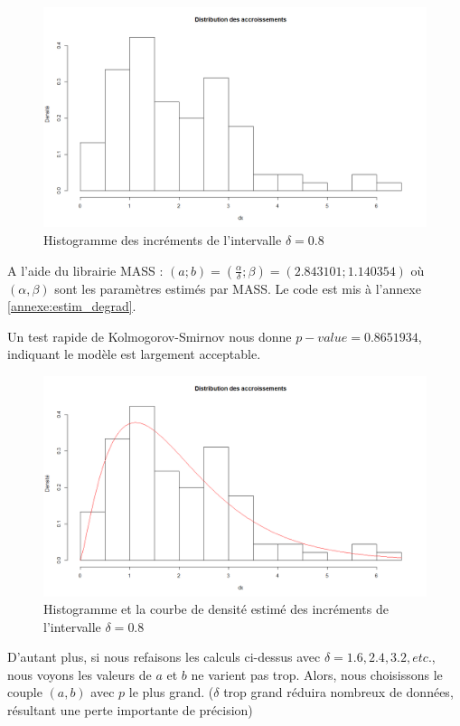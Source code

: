\documentclass[10pt,a4paper]{article}
\begin{document}
\begin{figure}[!h]
    \centering
    \includegraphics[width=\textwidth]{img/histo_degrad.png}
    \caption{Histogramme des incréments de l'intervalle $\delta = 0.8$}
    \label{fig:histo_degrad}
\end{figure}

A l'aide du librairie MASS : $\left( {a;b} \right) = \left( {\frac{\alpha }{\delta };\beta } \right) = \left( {2.843101;1.140354} \right)$ où $(\alpha, \beta)$ sont les paramètres estimés par MASS. Le code est mis à l'annexe \eqref{annexe:estim_degrad}.

Un test rapide de Kolmogorov-Smirnov nous donne $p-value = 0.8651934$, indiquant le modèle est largement acceptable.
\begin{figure}[!h]
    \centering
    \includegraphics[width=\textwidth]{img/histo_dens_degrad.png}
    \caption{Histogramme et la courbe de densité estimé des incréments de l'intervalle $\delta = 0.8$}
    \label{fig:histo_dens_degrad}
\end{figure}

D'autant plus, si nous refaisons les calculs ci-dessus avec $\delta = 1.6, 2.4, 3.2, etc.$, nous voyons les valeurs de $a$ et $b$ ne varient pas trop. Alors, nous choisissons le couple $(a,b)$ avec $p$ le plus grand. ($\delta$ trop grand réduira nombreux de données, résultant une perte importante de précision)
\end{document}
